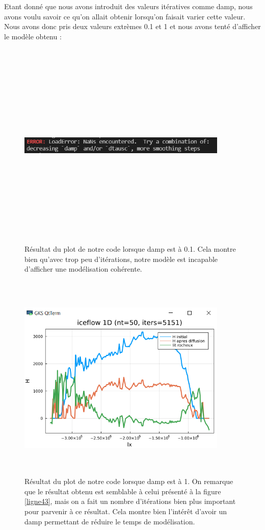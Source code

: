 \documentclass{article}
\begin{document}
Etant donné que nous avons introduit des valeurs itératives comme damp, nous avons voulu savoir ce qu'on allait obtenir lorsqu'on faisait varier cette valeur. Nous avons donc pris deux valeurs extrèmes 0.1 et 1 et nous avons tenté d'afficher le modèle obtenu :
\begin{figure}[!htpb]
\centering
\includegraphics[width=10cm, keepaspectratio=true, height=10cm]{Damp01.png}
\caption{Résultat du plot de notre code lorsque damp est à 0.1. Cela montre bien qu'avec trop peu d'itérations, notre modèle est incapable d'afficher une modélisation cohérente.}
\end{figure}

\begin{figure}[!htpb]
\centering
\includegraphics[width=10cm, keepaspectratio=true, height=10cm]{Damp1.png}
\caption{Résultat du plot de notre code lorsque damp est à 1. On remarque que le résultat obtenu est semblable à celui présenté à la figure \ref{ligne43}, mais on a fait un nombre d'itérations bien plus important pour parvenir à ce résultat. Cela montre bien l'intérêt d'avoir un damp permettant de réduire le temps de modélisation.}
\end{figure}
\newpage


\end{document}
